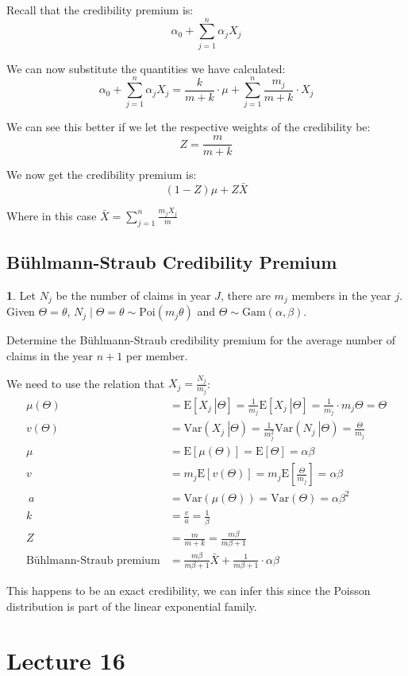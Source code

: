 \documentclass[english,12pt]{article}
\theoremstyle{plain}
\theoremstyle{definition}
\newtheorem*{example}{\protect\examplename}
\theoremstyle{definition} %
\providecommand{\examplename}{Example}
\newcommand{\ex}[1]{\mbox{E} \left[ #1 \right]}
\newcommand{\var}[1]{\mbox{Var} \left( #1 \right)}
\newcommand{\condex}[2]{\mbox{E} \left[ \left. #1 \ \right\vert \left. #2 \right. \right]}
\newcommand{\condvar}[2]{\mbox{Var} \left( \left. #1 \ \right\lvert \left. #2 \right. \right)}
\begin{document}
Recall that the credibility premium is: 
\[\alpha_0+\sum_{j=1}^n\alpha_jX_j\]

We can now substitute the quantities we have calculated:
\[\alpha_0+\sum_{j=1}^n\alpha_jX_j=\frac{k}{m+k}\cdot\mu+\sum_{j=1}^n\frac{m_j}{m+k}\cdot X_j\]

We can see this better if we let the respective weights of the credibility be:
\[Z=\frac{m}{m+k}\]

We now get the credibility premium is:
\[(1-Z)\mu+Z\bar{X}\]

Where in this case $\bar{X}=\sum\limits_{j=1}^n\frac{m_jX_j}{m}$

\subsection{B\"{u}hlmann-Straub Credibility Premium}
\begin{example}
Let $N_j$ be the number of claims in year $J$, there are $m_j$ members in the year $j$.  Given $\Theta=\theta$, $N_j\mid\Theta=\theta\sim\text{Poi}(m_j\theta)$ and $\Theta\sim\text{Gam}(\alpha,\beta)$.

Determine the B\"{u}hlmann-Straub credibility premium for the average number of claims in the year $n+1$ per member.

We need to use the relation that $X_j=\frac{N_j}{m_j}$:
\begin{align*}
\mu(\Theta)
&=\condex{X_j}{\Theta}
=\frac{1}{m_j}\condex{X_j}{\Theta}
=\frac{1}{m_j}\cdot m_j\Theta
=\Theta\\
v(\Theta)&=\condvar{X_j}{\Theta}
=\frac{1}{m_j^2}\condvar{N_j}{\Theta}
=\frac{\Theta}{m_j}\\
\mu&=\ex{\mu(\Theta)}
=\ex{\Theta}
=\alpha\beta\\
v&=m_j\ex{v(\Theta)}
=m_j\ex{\frac{\Theta}{m_j}}
=\alpha\beta\\\
a&=\var{\mu(\Theta)}
=\var{\Theta}
=\alpha\beta^2\\
k&=\frac{v}{a}
=\frac{1}{\beta}\\
Z&=\frac{m}{m+k}
=\frac{m\beta}{m\beta+1}\\
\text{B\"{u}hlmann-Straub premium}&=\frac{m\beta}{m\beta+1}\bar{X}+\frac{1}{m\beta+1}\cdot\alpha\beta
\end{align*}

This happens to be an exact credibility, we can infer this since the Poisson distribution is part of the linear exponential family.
\end{example}


\section*{Lecture 16}
\end{document}
